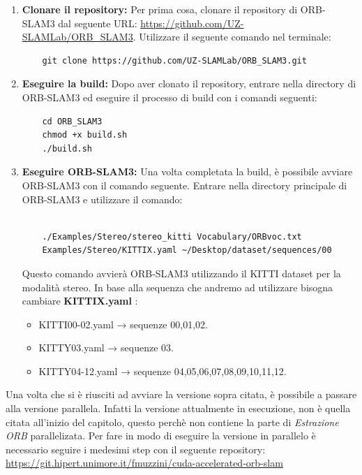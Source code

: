 \documentclass[12pt,a4paper]{report}
\begin{document}
\begin{enumerate}
    \item \textbf{Clonare il repository:} Per prima cosa, clonare il repository di ORB-SLAM3 dal seguente URL: \url{https://github.com/UZ-SLAMLab/ORB_SLAM3}. Utilizzare il seguente comando nel terminale:

    \begin{verbatim}
    git clone https://github.com/UZ-SLAMLab/ORB_SLAM3.git
    \end{verbatim}

    \item \textbf{Eseguire la build:} Dopo aver clonato il repository, entrare nella directory di ORB-SLAM3 ed eseguire il processo di build con i comandi seguenti:

    \begin{verbatim}
    cd ORB_SLAM3
    chmod +x build.sh
    ./build.sh
    \end{verbatim}

    \item \textbf{Eseguire ORB-SLAM3:} Una volta completata la build, è possibile avviare ORB-SLAM3 con il comando seguente. Entrare nella directory principale di ORB-SLAM3 e utilizzare il comando:

    \noindent
    \begin{verbatim}
    
    ./Examples/Stereo/stereo_kitti Vocabulary/ORBvoc.txt 
    Examples/Stereo/KITTIX.yaml ~/Desktop/dataset/sequences/00
    \end{verbatim}

    Questo comando avvierà ORB-SLAM3 utilizzando il KITTI dataset per la modalità stereo.
    In base alla sequenza che andremo ad utilizzare bisogna cambiare \textbf{KITTIX.yaml} : 
    \begin{itemize}
        \item  KITTI00-02.yaml → sequenze 00,01,02.
        \item KITTY03.yaml → sequenze 03.
        \item KITTY04-12.yaml → sequenze 04,05,06,07,08,09,10,11,12.
    \end{itemize}
\end{enumerate}

\newline

Una volta che si è riusciti ad avviare la versione sopra citata, è possibile a passare alla versione parallela.
Infatti la versione attualmente in esecuzione, non è quella citata all'inizio del capitolo, questo perchè non contiene la parte di \textit{Estrazione ORB} parallelizata.
Per fare in modo di eseguire la versione in parallelo è necessario seguire i medesimi step con il seguente repository: \url{https://git.hipert.unimore.it/fmuzzini/cuda-accelerated-orb-slam}
\end{document}
